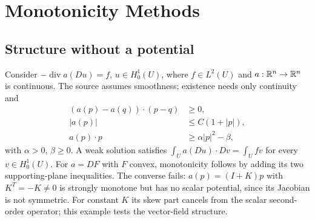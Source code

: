 \section{Monotonicity Methods}
\label{sec:9-1}
\Needspace{40mm}
\subsection{Structure without a potential}
Consider $-\operatorname{div}a(Du)=f$, $u\in H^1_0(U)$, where
$f\in L^2(U)$ and $a:\mathbb{R}^n\to\mathbb{R}^n$ is continuous. The source assumes
smoothness; existence needs only continuity and
\begin{equation}\label{eq:9-monotone}
 \begin{split}
 (a(p)-a(q))\cdot(p-q)&\geq0,\\
 |a(p)|&\leq C(1+|p|),\\
 a(p)\cdot p&\geq\alpha|p|^2-\beta,
 \end{split}
\end{equation}
with $\alpha>0$, $\beta\geq0$. A weak solution satisfies
$\int_U a(Du)\cdot Dv=\int_Ufv$ for every $v\in H^1_0(U)$.
For $a=DF$ with $F$ convex, monotonicity follows by adding its two
supporting-plane inequalities. The converse fails: $a(p)=(I+K)p$ with
$K^T=-K\ne0$ is strongly monotone but has no scalar potential, since its
Jacobian is not symmetric. For constant $K$ its skew part cancels from the
scalar second-order operator; this example tests the vector-field structure.
\Needspace{42mm}

\Needspace{40mm}

